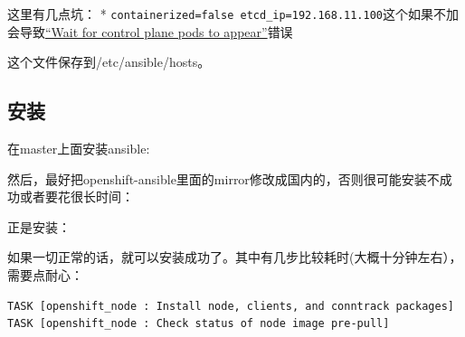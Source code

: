 \documentclass[12pt]{article}
\begin{document}
这里有几点坑： * \texttt{containerized=false\ etcd\_ip=192.168.11.100}这个如果不加会导致\href{https://github.com/eliu/openshift-vagrant/issues/10}{``Wait for control plane pods to appear''}错误

这个文件保存到/etc/ansible/hosts。

\subsection{安装}\label{ux5b89ux88c5}

在master上面安装ansible:

\begin{Shaded}
\begin{Highlighting}[]
 
\end{Highlighting}
\end{Shaded}

然后，最好把openshift-ansible里面的mirror修改成国内的，否则很可能安装不成功或者要花很长时间：

\begin{Shaded}
\begin{Highlighting}[]
  
\end{Highlighting}
\end{Shaded}

正是安装：

\begin{Shaded}
\begin{Highlighting}[]
\KeywordTok{\&\&} 
\end{Highlighting}
\end{Shaded}

如果一切正常的话，就可以安装成功了。其中有几步比较耗时(大概十分钟左右），需要点耐心：

\begin{verbatim}
TASK [openshift_node : Install node, clients, and conntrack packages]
TASK [openshift_node : Check status of node image pre-pull]
\end{verbatim}
\end{document}
